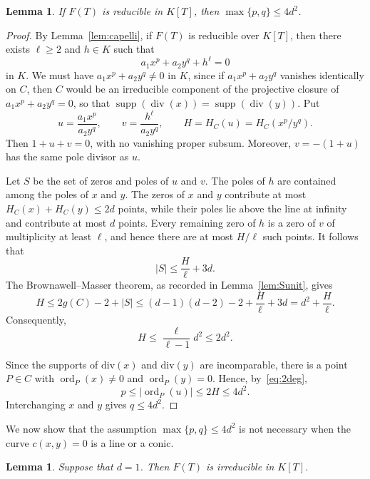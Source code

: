 \documentclass[a4paper,11pt,twoside,reqno]{amsart}
\newtheorem{lemma}[theorem]{Lemma}
\theoremstyle{definition}
\theoremstyle{remark}
\numberwithin{equation}{section}
\newcommand\supp{\operatorname{supp}}
\newcommand\ord{\operatorname{ord}}
\newcommand\1{\mathbf{1}}
\renewcommand\div{\mathrm{div}}
\renewcommand{\leq}{\leqslant}
\renewcommand{\geq}{\geqslant}
\begin{document}
\begin{lemma}\label{cor:Firr}
If $F(T)$ is reducible in $K[T]$, then
$\max\{p,q\}\leq4d^2$.
\end{lemma}

\begin{proof}
By Lemma~\ref{lem:capelli}, if $F(T)$ is reducible over $K[T]$, then there exists $\ell\geq2$ and $h\in K$ such that
\[
a_1x^p+a_2y^q+h^\ell=0
\]
in $K$.
We must have 
$a_1x^p+a_2y^q\neq0$ in $K$, since 
if $a_1x^p+a_2y^q$ vanishes identically on $C$, then $C$ would be an irreducible component of the projective closure of $a_1x^p+a_2y^q=0$, so that $\supp(\operatorname{div}(x))= \supp(\operatorname{div}(y))$. 
Put
\[
u=\frac{a_1x^p}{a_2y^q},
\qquad
v=\frac{h^\ell}{a_2y^q},
\qquad
H=H_C(u)=H_C(x^p/y^q).
\]
Then $1+u+v=0$, with no vanishing proper subsum. Moreover,
$v=-(1+u)$ has the same pole divisor as $u$.

Let $S$ be the set of zeros and poles of $u$ and $v$. The
poles of $h$ are contained among the poles of $x$ and $y$.
The zeros of $x$ and $y$ contribute at most
$H_C(x)+H_C(y)\leq2d$ points, while their poles lie above the
line at infinity and contribute at most $d$ points. Every
remaining zero of $h$ is a zero of $v$ of multiplicity at
least $\ell$, and hence there are at most $H/\ell$ such
points. It follows that 
\[
|S|\leq\frac H\ell+3d.
\]
The Brownawell--Masser theorem, as recorded in 
Lemma~\ref{lem:Sunit}, 
gives
\[
H\leq2g(C)-2+|S|
 \leq (d-1)(d-2)-2+\frac H\ell+3d
 =d^2+\frac H\ell.
\]
Consequently,
\[
H\leq\frac{\ell}{\ell-1}d^2\leq2d^2.
\]

Since the supports of $\div(x)$ and $\div(y)$ are
incomparable, there is a point $P\in C$ with
$\ord_P(x)\neq0$ and $\ord_P(y)=0$. Hence, by~\eqref{eq:2deg},
\[
p\leq|\ord_P(u)|\leq2H\leq4d^2.
\]
Interchanging $x$ and $y$ gives $q\leq4d^2$.
\end{proof}

We now show that the assumption $\max\{p,q\}\leq 4d^2$ is not necessary when the curve $c(x,y)=0$ is a line or a conic.

\begin{lemma}\label{lem:lineirr}
Suppose that $d=1$.
Then $F(T)$ is irreducible in $K[T]$.
\end{lemma}
\end{document}
